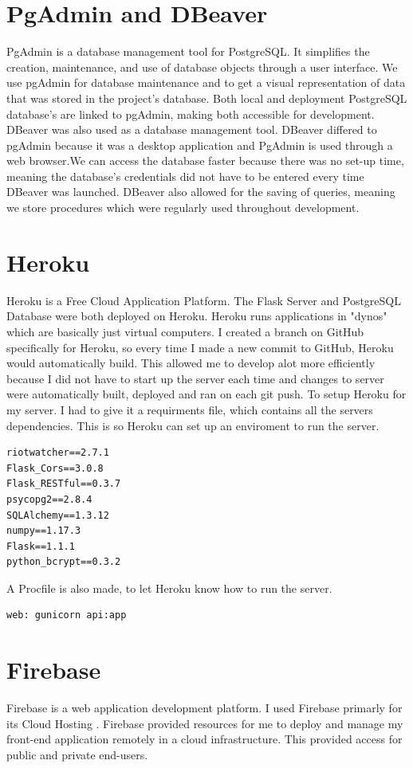 \section{PgAdmin and DBeaver}
PgAdmin \cite{pgadmin} is a database management tool for PostgreSQL. It simplifies the creation, maintenance, and use of database objects through a user interface. We use pgAdmin for database maintenance and to get a visual representation of data that was stored in the project's database. Both local and deployment PostgreSQL database's are linked to pgAdmin, making both accessible for development. \hfill \break
DBeaver was also used as a database management tool. DBeaver differed to pgAdmin because it was a desktop application and PgAdmin is used through a web browser.We can access the database faster because there was no set-up time, meaning the database's credentials did not have to be entered every time DBeaver was launched. DBeaver also allowed for the saving of queries, meaning we store procedures which were regularly used throughout development.
\section{Heroku}
Heroku \cite{heroku} is a Free Cloud Application Platform. The Flask Server and PostgreSQL Database were both deployed on Heroku. Heroku runs applications in "dynos" which are basically just virtual computers. I created a branch on GitHub specifically for Heroku, so every time I made a new commit to GitHub, Heroku would automatically build. This allowed me to develop alot more efficiently because I did not have to start up the server each time and changes to server were automatically built, deployed and ran on each git push. \hfill \break
To setup Heroku for my server. I had to give it a requirments file, which contains all the servers dependencies. This is so Heroku can set up an enviroment to run the server.
\begin{verbatim}
riotwatcher==2.7.1
Flask_Cors==3.0.8
Flask_RESTful==0.3.7
psycopg2==2.8.4
SQLAlchemy==1.3.12
numpy==1.17.3
Flask==1.1.1
python_bcrypt==0.3.2
\end{verbatim}
A Procfile is also made, to let Heroku know how to run the server.
\begin{verbatim}
web: gunicorn api:app
\end{verbatim}
\newpage
\section{Firebase}
Firebase \cite{firebase} is a web application development platform. I used Firebase primarly for its Cloud Hosting \cite{peteva2017cloud}. Firebase provided resources for me to deploy and manage my front-end application remotely in a cloud infrastructure. This provided access for public and private end-users.
